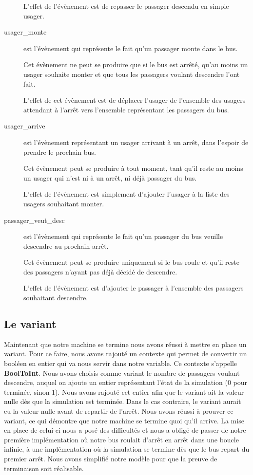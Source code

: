 \documentclass[a4paper,titlepage]{report}
\begin{document}
\begin{description}
			L'effet de l'évènement est de repasser le passager descendu en simple usager. \\
			
			\item[usager\_monte] est l'évènement qui représente le fait qu'un passager monte dans le bus.
			
			Cet évènement ne peut se produire que si le bus est arrêté, qu'au moins un usager souhaite monter et que tous les passagers voulant descendre l'ont fait.
			
			L'effet de cet évènement est de déplacer l'usager de l'ensemble des usagers attendant à l'arrêt vers l'ensemble représentant les passagers du bus.\\
		
			\item[usager\_arrive] est l'évènement représentant un usager arrivant à un arrêt, dans l'espoir de prendre le prochain bus.
			
			Cet évènement peut se produire à tout moment, tant qu'il reste au moins un usager qui n'est ni à un arrêt, ni déjà passager du bus.
			
			L'effet de l'évènement est simplement d'ajouter l'usager à la liste des usagers souhaitant monter.\\
			
			\item[passager\_veut\_desc] est l'évènement qui représente le fait qu'un passager du bus veuille descendre au prochain arrêt.
			
			Cet évènement peut se produire uniquement si le bus roule et qu'il reste des passagers n'ayant pas déjà décidé de descendre.
			
			L'effet de l'évènement est d'ajouter le passager à l'ensemble des passagers souhaitant descendre.\\
		\end{description}

	\subsection{Le variant}
		Maintenant que notre machine se termine nous avons réussi à mettre en place un variant. Pour ce faire, nous avons rajouté un contexte qui permet de convertir un booléen en entier qui va nous servir dans notre variable. Ce contexte s'appelle \textbf{BoolToInt}. Nous avons choisis comme variant le nombre de passagers voulant descendre, auquel on ajoute un entier représentant l'état de la simulation (0 pour terminée, sinon 1). Nous avons rajouté cet entier afin que le variant ait la valeur nulle dès que la simulation est terminée. Dans le cas contraire, le variant aurait eu la valeur nulle avant de repartir de l'arrêt. Nous avons réussi à prouver ce variant, ce qui démontre que notre machine se termine quoi qu'il arrive. La mise en place de celui-ci nous a posé des difficultés et nous a obligé de passer de notre première implémentation où notre bus roulait d'arrêt en arrêt dans une boucle infinie, à une implémentation où la simulation se termine dès que le bus repart du premier arrêt. Nous avons simplifié notre modèle pour que la preuve de terminaison soit réalisable.
		
\end{document}
